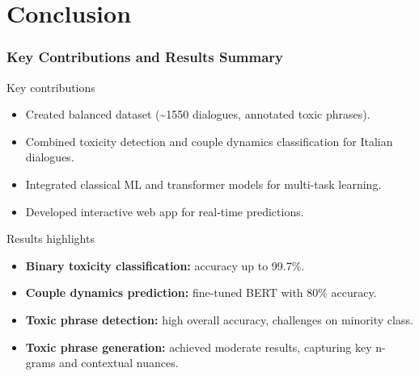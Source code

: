 \documentclass[aspectratio=169,xcolor=dvipsnames]{beamer}
\begin{document}
\section{Conclusion}

\begin{frame}
\frametitle{Key Contributions and Results Summary}

\begin{block}{Key contributions}
\begin{itemize}
\item Created balanced dataset (\textasciitilde 1550 dialogues, annotated toxic phrases).
\item Combined toxicity detection and couple dynamics classification for Italian dialogues.
\item Integrated classical ML and transformer models for multi-task learning.
\item Developed interactive web app for real-time predictions.
\end{itemize}
\end{block}

\begin{block}{Results highlights}
\begin{itemize}
\item \textbf{Binary toxicity classification:} accuracy up to 99.7\%.
\item \textbf{Couple dynamics prediction:} fine-tuned BERT with 80\% accuracy.
\item \textbf{Toxic phrase detection:} high overall accuracy, challenges on minority class.
\item \textbf{Toxic phrase generation:} achieved moderate results, capturing key n-grams and contextual nuances.
\end{itemize}
\end{block}

\end{frame}
\end{document}
